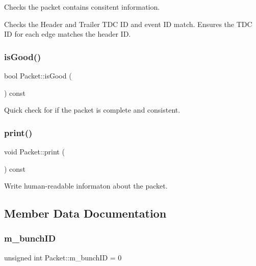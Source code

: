 Checks the packet contains consitent information. 

Checks the Header and Trailer T\+DC ID and event ID match. Ensures the T\+DC ID for each edge matches the header ID. \mbox{\label{class_packet_ae70511a50e1f186b8a3369ee6ab8589c}} 
\subsubsection{\texorpdfstring{is\+Good()}{isGood()}}
{\footnotesize\ttfamily bool Packet\+::is\+Good (\begin{DoxyParamCaption}{ }\end{DoxyParamCaption}) const\hspace{0.3cm}{\ttfamily [inline]}}



Quick check for if the packet is complete and consistent. 

\mbox{\label{class_packet_aec87fc2f2473111a694ad8b6f60e7666}} 
\subsubsection{\texorpdfstring{print()}{print()}}
{\footnotesize\ttfamily void Packet\+::print (\begin{DoxyParamCaption}{ }\end{DoxyParamCaption}) const}



Write human-\/readable informaton about the packet. 



\subsection{Member Data Documentation}
\mbox{\label{class_packet_ad0a2dce379a45ee0f899d495f5e760fc}} 
\subsubsection{\texorpdfstring{m\+\_\+bunch\+ID}{m\_bunchID}}
{\footnotesize\ttfamily unsigned int Packet\+::m\+\_\+bunch\+ID = 0\hspace{0.3cm}{\ttfamily [private]}}



